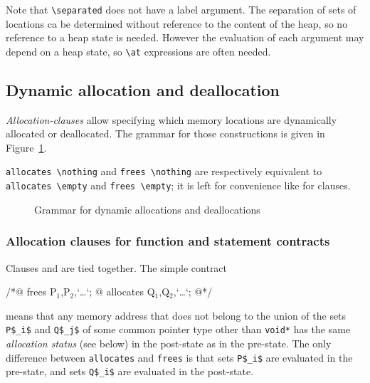 Note that \lstinline|\separated| does not have a label argument. The separation of sets of locations
ca be determined without reference to the content of the heap, so no reference to a heap state is needed.
However the evaluation of each argument may depend on a heap state, so \lstinline|\at| expressions are often needed.


\subsection{Dynamic allocation and deallocation}
\label{sec:allocation-clause}

\experimental

\textsl{Allocation-clauses} allow specifying which memory locations 
are dynamically allocated or deallocated.
The grammar for those constructions is given in Figure~\ref{fig:gram:allocation}.

\lstinline|allocates \nothing| and \lstinline|frees \nothing| are respectively 
equivalent to \lstinline|allocates \empty| and \lstinline|frees \empty|; 
it is left for convenience like for \assigns clauses.

\begin{figure}[t]
  \begin{cadre}
      
    \end{cadre}
  \caption{Grammar for dynamic allocations and deallocations}
\label{fig:gram:allocation}
\end{figure}

\subsubsection{Allocation clauses for function and statement contracts}
\label{subsec:allocation-contract}

Clauses \allocates and \frees are tied together. The simple contract  
\begin{listing-nonumber}
/*@ frees P$_1$,P$_2$,`\dots`;
  @ allocates Q$_1$,Q$_2$,`\dots`;
  @*/
\end{listing-nonumber}
means that any memory address that does not belong to the union of the sets \lstinline|P$_i$| and \lstinline|Q$_j$| of
some common pointer type other than \lstinline|void*|
has the same {\sl allocation status} 
(see below) in the post-state as in the pre-state. The only difference
between \lstinline|allocates| and \lstinline|frees| is that sets 
\lstinline|P$_i$| are evaluated 
in the pre-state, and sets \lstinline|Q$_i$| are evaluated in the post-state.

